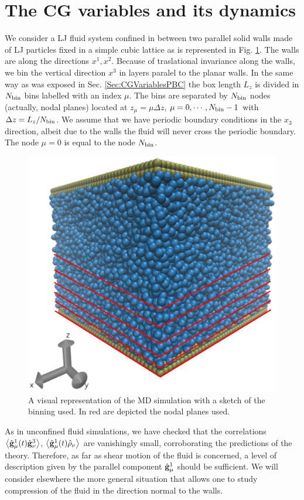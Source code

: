 \documentclass[a4paper,openright,12pt]{book}
\newcommand{\llangle}{\left\langle}
\newcommand{\rrangle}{\right\rangle}
\begin{document}
\section{The CG variables and its dynamics}
We  consider a  LJ  fluid system  confined  in between  two
parallel solid walls made of LJ particles fixed in a simple
cubic lattice as is represented in Fig. \ref{fig:WallsBox}. The walls are  along the directions $x^1,x^2$.  Because
of  traslational  invariance along  the  walls,  we bin  the  vertical
direction $x^3$ in layers paralel to  the planar walls. In the same way as was exposed in Sec. \ref{Sec:CGVariablesPBC} the box length
$L_z$ is divided  in $N_{\rm bin}$ bins labelled with  an index $\mu$.
The bins are separated by $N_{\rm bin}$ nodes (actually, nodal planes)
located  at $z_\mu=\mu  \Delta z$,  $\mu=0,\cdots,N_{\rm bin}-1$  with
$\Delta z=L_z/N_{\rm bin}$.  We assume  that we have periodic boundary
conditions in the  $x_3$ direction, albeit due to the  walls the fluid
will never  cross the periodic boundary.   The node $\mu=0$ is equal to the node
$N_{\rm bin}$.   
\begin{figure}
    \centering
    \includegraphics[scale=0.3]{system_nodes_walls}
    \caption[Walls box]{A visual representation of the MD simulation with a sketch of the binning used. In red are depicted the nodal planes used.}
    \label{fig:WallsBox}
\end{figure}
As in unconfined fluid simulations, we have checked that the correlations   $\llangle   \hat{\bf
  g}^1_\mu(t)\hat{\bf     g}^3_\nu\rrangle$,    $\llangle     \hat{\bf
  g}^1_\mu(t)\hat{\rho}_\nu\rrangle$     are    vanishingly     small,
corroborating  the predictions  of the  theory. Therefore,  as far  as
shear motion of  the fluid is concerned, a level  of description given
by the  parallel component  $\hat{\bf g}^1_\mu$ should  be sufficient.
We will consider elsewhere the  more general situation that allows one
to  study compression  of the  fluid in  the direction  normal to  the
walls.
\end{document}
